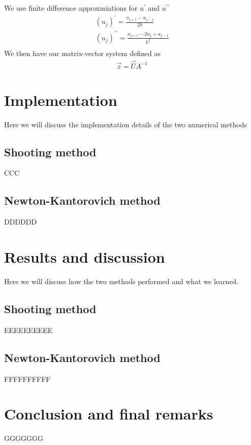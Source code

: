 \documentclass{article}
\begin{document}
\begin{enumerate}
We use finite difference approxmiations for $u^\prime$ and $u^{\prime\prime}$
\begin{align}
(u_j)^\prime = \frac{u_{j+1} - u_{j-1}}{2h} \\
(u_j)^{\prime\prime} = \frac{u_{j+1} - 2u_{j} + u_{j-1}}{h^2} \\
\end{align}
We then have our matrix-vector system defined as
\begin{align}
\vec{z} = \vec{U} A^{-1} 
\end{align}
\end{enumerate}
\section{Implementation}
Here we will discuss the implementation details of the two numerical methods
\subsection{Shooting method}
CCC
\subsection{Newton-Kantorovich method}
DDDDDD
\section{Results and discussion}
Here we will discuss how the two methods performed and what we learned. 
\subsection{Shooting method}
EEEEEEEEEE
\subsection{Newton-Kantorovich method}
FFFFFFFFFF
\section{Conclusion and final remarks}
GGGGGGG
\end{document}
